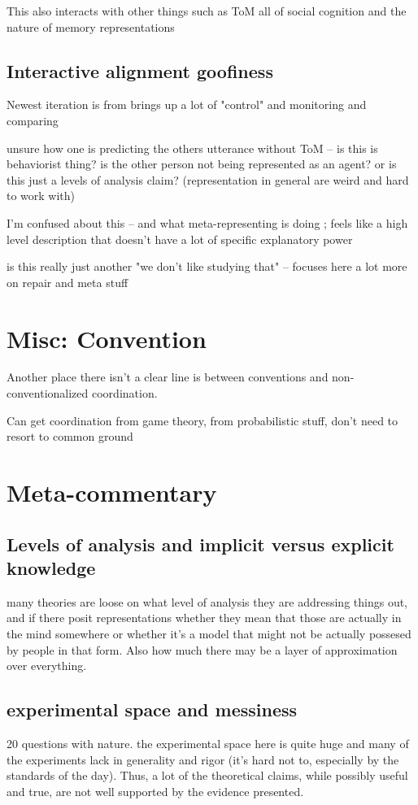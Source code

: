 \documentclass[]{article}
\begin{document}
This also interacts with other things such as ToM all of social cognition and the nature of memory representations 

\subsection{Interactive alignment goofiness}

Newest iteration is from \cite{gandolfi2022} brings up a lot of "control" and monitoring and comparing 

unsure how one is predicting the others utterance without ToM -- is this is behaviorist thing? is the other person not being represented as an agent? or is this just a levels of analysis claim? (representation in general are weird and hard to work with)

I'm confused about this -- and what meta-representing is doing ; feels like a high level description that doesn't have a lot of specific explanatory power

is this really just another "we don't like studying that" -- focuses here a lot more on repair and meta stuff 



\section{Misc: Convention}

Another place there isn't a clear line is between conventions and non-conventionalized coordination. 

Can get coordination from game theory, from probabilistic stuff, don't need to resort to common ground

\section{Meta-commentary}
\subsection{ Levels of analysis and implicit versus explicit knowledge}
many theories are loose on what level of analysis they are addressing things out, and if there posit representations whether they mean that those are actually in the mind somewhere or whether it's a model that might not be actually possesed by people in that form. Also how much there may be a layer of approximation over everything. 

\subsection{experimental space and messiness}
20 	questions with nature. 
the experimental space here is quite huge and many of the experiments lack in generality and rigor (it's hard not to, especially by the standards of the day). Thus, a lot of the theoretical claims, while possibly useful and true, are not well supported by the evidence presented. 
\end{document}
